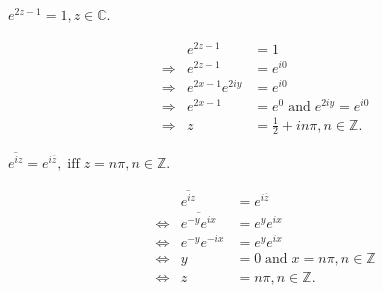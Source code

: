 \documentclass[12pt]{book}
\begin{document}
\begin{exmp}
    $e^{2z - 1} = 1, z \in \mathbb{C}.$
\end{exmp}
\begin{align*}
    &&e^{2z - 1}
        &=
            1 \\
    &\Rightarrow &e^{2z - 1}
        &=
            e^{i0} \\
    &\Rightarrow &e^{2x - 1}e^{2iy}
        &=
            e^{i0} \\
    &\Rightarrow &e^{2x - 1}
        &=
            e^{0}\;
    \text{and}\;
    e^{2iy}
        =
            e^{i0} \\
    &\Rightarrow &z
        &=
            \frac{1}{2} + in\pi, n \in \mathbb{Z}. 
\end{align*}

\begin{exmp}
    $\overline{e^{iz}} = e^{i\overline{z}},\; \text{iff}\; z = n\pi, n \in \mathbb{Z}.$
\end{exmp}
\begin{align*}
    &&\overline{e^{iz}} 
        &= 
            e^{i\overline{z}} \\
    &\iff &\overline{e^{-y}e^{ix}}
        &=
            e^{y}e^{ix} \\
    &\iff &e^{-y}e^{-ix}
        &=
            e^{y}e^{ix} \\
    &\iff &y
        &=
            0\;
    \text{and}\;
    x
        =
            n\pi, n \in \mathbb{Z} \\
    &\iff &z
        &= 
            n\pi, n \in \mathbb{Z}.    
\end{align*}
\end{document}
